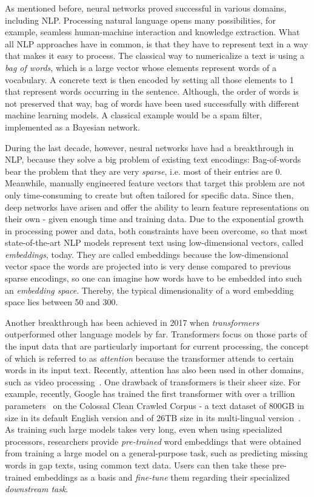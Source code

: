 As mentioned before, neural networks proved successful in various domains, including NLP. Processing natural language opens many possibilities, for example, seamless human-machine interaction and knowledge extraction. What all NLP approaches have in common, is that they have to represent text in a way that makes it easy to process. The classical way to numericalize a text is using a \emph{bag of words}, which is a large vector whose elements represent words of a vocabulary. A concrete text is then encoded by setting all those elements to 1 that represent words occurring in the sentence. Although, the order of words is not preserved that way, bag of words have been used successfully with different machine learning models. A classical example would be a spam filter, implemented as a Bayesian network.

During the last decade, however, neural networks have had a breakthrough in NLP, because they solve a big problem of existing text encodings: Bag-of-words bear the problem that they are very \emph{sparse}, i.e. most of their entries are 0. Meanwhile, manually engineered feature vectors that target this problem are not only time-consuming to create but often tailored for specific data. Since then, deep networks have arisen and offer the ability to learn feature representations on their own - given enough time and training data. Due to the exponential growth in processing power and data, both constraints have been overcome, so that most state-of-the-art NLP models represent text using low-dimensional vectors, called \emph{embeddings}, today. They are called embeddings because the low-dimensional vector space the words are projected into is very dense compared to previous sparse encodings, so one can imagine how words have to be embedded into such an \emph{embedding space}. Thereby, the typical dimensionality of a word embedding space lies between 50 and 300.

Another breakthrough has been achieved in 2017 when \emph{transformers} outperformed other language models by far. Transformers focus on those parts of the input data that are particularly important for current processing, the concept of which is referred to as \emph{attention} because the transformer attends to certain words in its input text. Recently, attention has also been used in other domains, such as video processing~\cite{Bertasius2021IsSA}. One drawback of transformers is their sheer size. For example, recently, Google has trained the first transformer with over a trillion parameters~\cite{Fedus2021SwitchTS} on the Colossal Clean Crawled Corpus - a text dataset of 800GB in size in its default English version and of 26TB size in its multi-lingual version~\cite{C4}. As training such large models takes very long, even when using specialized processors, researchers provide \emph{pre-trained} word embeddings that were obtained from training a large model on a general-purpose task, such as predicting missing words in gap texts, using common text data. Users can then take these pre-trained embeddings as a basis and \emph{fine-tune} them regarding their specialized \emph{downstream task}.
